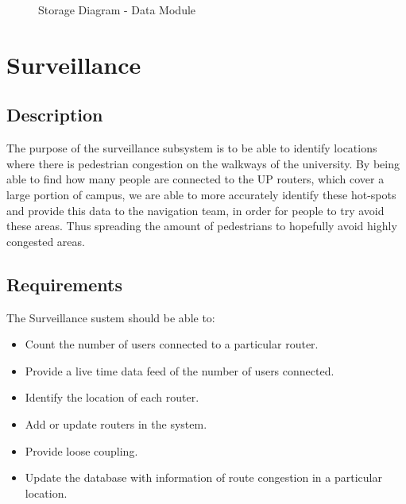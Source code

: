 \documentclass[english]{article}
\begin{document}
        \begin{figure}[H]
            \centering	            
            \centerline{}
            \caption{Storage Diagram - Data Module}
        \end{figure} 
        
    \section{Surveillance}    
        \subsection{Description}    
            The purpose of the surveillance subsystem is to be able to identify locations where there is pedestrian congestion on the walkways of the university.
            By being able to find how many people are connected to the UP routers, which cover a large portion of campus, we are able to more accurately identify these hot-spots and provide this data to the navigation team, in order for people to try avoid these areas. Thus spreading the amount of pedestrians to hopefully avoid highly congested areas. 
        \subsection{Requirements}
        The Surveillance sustem should be able to:
            \begin{itemize}
                \item Count the number of users connected to a particular router.
                \item Provide a live time data feed of the number of users connected.
                \item Identify the location of each router.
                \item Add or update routers in the system.
                \item Provide loose coupling.
                \item Update the database with information of route congestion in a particular location.
            \end{itemize}
    
\end{document}
